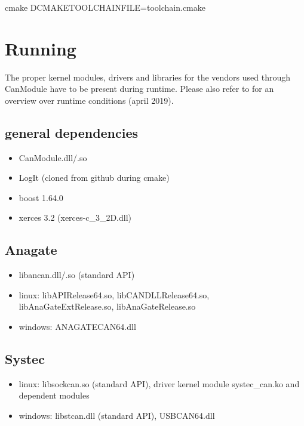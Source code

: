 \documentclass[letterpaper,10pt,english]{sphinxmanual}
\begin{document}
\begin{sphinxVerbatim}[commandchars=\\\{\}]
cmake \PYGZhy{}DCMAKE\PYGZus{}TOOLCHAIN\PYGZus{}FILE=toolchain.cmake
\end{sphinxVerbatim}


\chapter{Running}
\label{\detokenize{running:running}}\label{\detokenize{running::doc}}
The proper kernel modules, drivers and libraries for the vendors used through CanModule
have to be present during runtime. Please also refer to  for an overview over
runtime conditions (april 2019).


\section{general dependencies}
\label{\detokenize{running:general-dependencies}}\begin{itemize}
\item {} 
CanModule.dll/.so

\item {} 
LogIt (cloned from github during cmake)

\item {} 
boost 1.64.0

\item {} 
xerces 3.2 (xerces-c\_3\_2D.dll)

\end{itemize}


\section{Anagate}
\label{\detokenize{running:anagate}}\begin{itemize}
\item {} 
libancan.dll/.so  (standard API)

\item {} 
linux: libAPIRelease64.so, libCANDLLRelease64.so, libAnaGateExtRelease.so, libAnaGateRelease.so

\item {} 
windows: ANAGATECAN64.dll

\end{itemize}


\section{Systec}
\label{\detokenize{running:systec}}\begin{itemize}
\item {} 
linux: libsockcan.so (standard API), driver kernel module systec\_can.ko and dependent modules

\item {} 
windows: libstcan.dll (standard API), USBCAN64.dll

\end{itemize}
\end{document}
